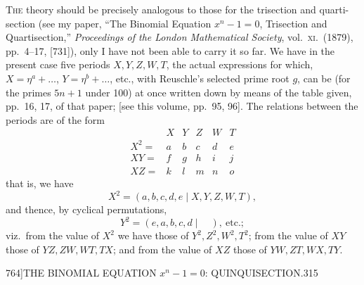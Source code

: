 \documentclass[11pt]{article}
\begin{document}
\textsc{The} theory should be precisely analogous to those for the trisection and quarti-section
(see my paper, ``The Binomial Equation $x^n - 1 = 0$, Trisection and Quartisection,''
\textit{Proceedings of the London Mathematical Society}, vol.\ \textsc{xi}.\ (1879), pp.\ 4--17, [731]),
only I have not been able to carry it so far. We have in the present case five
periods $X, Y, Z, W, T$, the actual expressions for which, $X = \eta^a + \ldots$, $Y = \eta^b + \ldots$, etc.,
with Reuschle's selected prime root $g$, can be (for the primes $5n + 1$ under 100) at
once written down by means of the table given, pp.\ 16, 17, of that paper; [see this
volume, pp.\ 95, 96]. The relations between the periods are of the form
\[
\begin{array}{c|ccccc}
 & X & Y & Z & W & T \\
\hline
X^2 = & a & b & c & d & e \\
XY = & f & g & h & i & j \\
XZ = & k & l & m & n & o
\end{array}
\]
that is, we have
\[
X^2 = (a, b, c, d, e \mid X, Y, Z, W, T),
\]
and thence, by cyclical permutations,
\[
Y^2 = (e, a, b, c, d \mid \quad ),\ \text{etc.};
\]
viz.\ from the value of $X^2$ we have those of $Y^2, Z^2, W^2, T^2$; from the value of $XY$
those of $YZ, ZW, WT, TX$; and from the value of $XZ$ those of $YW, ZT, WX, TY$.

\begin{center}
{\small 764]\hfill THE BINOMIAL EQUATION $x^n - 1 = 0$: QUINQUISECTION.\hfill 315}
\end{center}
\end{document}
